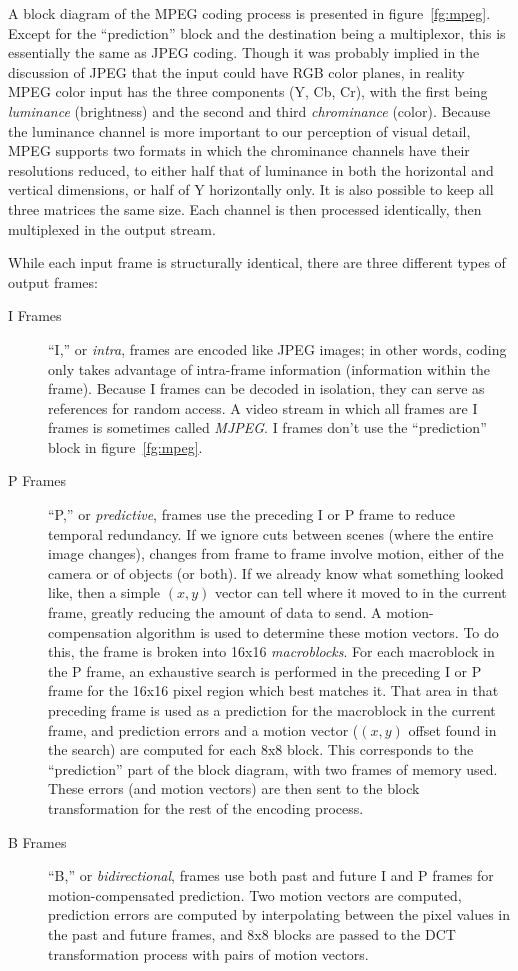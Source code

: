 A block diagram of the MPEG coding process is presented in
figure~\ref{fg:mpeg}. Except for the ``prediction'' block and the
destination being a multiplexor, this is essentially the same as JPEG
coding.  Though it was probably implied in the discussion of JPEG that the
input could have RGB color planes, in reality MPEG color input has the
three components (Y, Cb, Cr), with the first being
\emph{luminance} (brightness) and the second and third
\emph{chrominance} (color). Because the luminance channel is more
important to our perception of visual detail, MPEG supports two
formats in which the chrominance channels have their resolutions
reduced, to either half that of luminance in both the horizontal and
vertical dimensions, or half of Y horizontally only. It is also
possible to keep all three matrices the same size. Each channel is
then processed identically, then multiplexed in the output stream.

While each input frame is structurally identical, there are three
different types of output frames:

\begin{description}
\item[I Frames] ``I,'' or \emph{intra}, frames are encoded like JPEG
images; in other words, coding only takes advantage of intra-frame
information (information within the frame). Because I frames can be
decoded in isolation, they can serve as references for random
access. A video stream in which all frames are I frames is sometimes
called \emph{MJPEG}. I frames don't use the ``prediction'' block in
figure~\ref{fg:mpeg}.
\item[P Frames] ``P,'' or \emph{predictive}, frames use the preceding
I or P frame to reduce temporal redundancy. If we ignore cuts between
scenes (where the entire image changes), changes from frame to frame
involve motion, either of the camera or of objects (or both). If we
already know what something looked like, then a simple $(x,y)$ vector
can tell where it moved to in the current frame, greatly reducing the
amount of data to send. A motion-compensation algorithm is used to
determine these motion vectors. To do this, the frame is broken into
16x16 \emph{macroblocks}. For each macroblock in the P frame, an
exhaustive search is performed in the preceding I or P frame for the
16x16 pixel region which best matches it. That area in that preceding
frame is used as a prediction for the macroblock in the current frame, 
and prediction errors and a motion vector ($(x,y)$ offset found in the
search) are computed for each 8x8 block. This corresponds to the
``prediction'' part of the block diagram, with two frames of memory
used. These errors (and motion vectors) are then sent to the block
transformation for the rest of the encoding process.
\item[B Frames] ``B,'' or \emph{bidirectional}, frames use both past
and future I and P frames for motion-compensated prediction. Two
motion vectors are computed, prediction errors are computed by
interpolating between the pixel values in the past and future frames,
and 8x8 blocks are passed to the DCT transformation process with pairs
of motion vectors.
\end{description}

